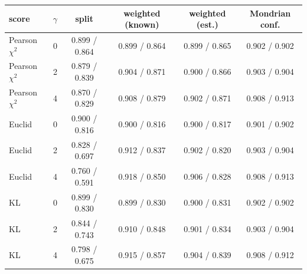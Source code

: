 \begin{tabular}{lrcccc}\toprule
score & $\gamma$ & split & weighted (known) & weighted (est.) & Mondrian conf.\\\midrule
Pearson $\chi^2$ & 0 & 0.899 / 0.864 & 0.899 / 0.864 & 0.899 / 0.865 & 0.902 / 0.902\\
Pearson $\chi^2$ & 2 & 0.879 / 0.839 & 0.904 / 0.871 & 0.900 / 0.866 & 0.903 / 0.904\\
Pearson $\chi^2$ & 4 & 0.870 / 0.829 & 0.908 / 0.879 & 0.902 / 0.871 & 0.908 / 0.913\\
Euclid & 0 & 0.900 / 0.816 & 0.900 / 0.816 & 0.900 / 0.817 & 0.901 / 0.902\\
Euclid & 2 & 0.828 / 0.697 & 0.912 / 0.837 & 0.902 / 0.820 & 0.903 / 0.904\\
Euclid & 4 & 0.760 / 0.591 & 0.918 / 0.850 & 0.906 / 0.828 & 0.908 / 0.913\\
KL & 0 & 0.899 / 0.830 & 0.899 / 0.830 & 0.900 / 0.831 & 0.902 / 0.902\\
KL & 2 & 0.844 / 0.743 & 0.910 / 0.848 & 0.901 / 0.834 & 0.903 / 0.904\\
KL & 4 & 0.798 / 0.675 & 0.915 / 0.857 & 0.904 / 0.839 & 0.908 / 0.912\\
\bottomrule\end{tabular}
